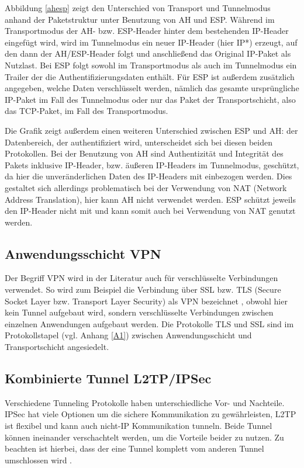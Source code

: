 Abbildung \ref{ahesp} zeigt den Unterschied von Transport und Tunnelmodus anhand der Paketstruktur unter Benutzung von AH und ESP. Während im Transportmodus der AH- bzw. ESP-Header  hinter dem bestehenden IP-Header eingefügt wird, wird im Tunnel\-modus ein neuer IP-Header (hier IP*) erzeugt, auf den dann der AH/ESP-Header folgt und anschließend das Original IP-Paket als Nutzlast. Bei ESP folgt sowohl im Transportmodus als auch im Tunnelmodus ein Trailer der die Authentifizierungsdaten enthält. Für ESP ist außerdem zusätzlich angegeben, welche Daten verschlüsselt werden, nämlich das gesamte ursprüngliche  IP-Paket im Fall des Tunnelmodus oder nur das Paket der Transportschicht, also  das TCP-Paket, im Fall des Transportmodus. 

Die Grafik zeigt außerdem einen weiteren Unterschied zwischen ESP und AH: der Datenbereich, der authentifiziert wird, unterscheidet sich bei diesen beiden Protokollen. Bei der Benutzung von AH sind Authentizität und Integrität des Pakets inklusive IP-Header, bzw. äußeren IP-Headers im Tunnelmodus,  geschützt, da hier die unveränderlichen Daten des IP-Headers mit einbezogen werden. Dies gestaltet sich allerdings problematisch bei der Verwendung von NAT (Network Address Translation), hier kann AH nicht verwendet werden. 
ESP schützt jeweils den IP-Header nicht mit und kann somit auch bei Verwendung von NAT genutzt werden. 

 
\subsection{Anwendungsschicht VPN}

Der Begriff VPN wird in der Literatur auch für verschlüsselte Verbindungen verwendet. So wird zum Beispiel die Verbindung über SSL bzw. TLS (Secure Socket Layer bzw. Transport Layer Security) als VPN bezeichnet \cite{isi-vpn} \cite{singh2012enhancing}, obwohl hier kein Tunnel aufgebaut wird, sondern verschlüsselte Verbindungen zwischen einzelnen Anwendungen aufgebaut werden. Die Protokolle TLS und SSL sind im Protokollstapel (vgl. Anhang \ref{A1}) zwischen Anwendungsschicht und Transportschicht angesiedelt. 

\subsection{Kombinierte Tunnel L2TP/IPSec}

Verschiedene Tunneling Protokolle haben unterschiedliche Vor- und Nachteile.  IPSec hat viele Optionen um die sichere Kommunikation zu gewährleisten, L2TP ist flexibel und kann auch nicht-IP Kommunikation tunneln. Beide Tunnel können ineinander verschachtelt werden, um die Vorteile beider zu nutzen. Zu beachten ist hierbei, dass der eine Tunnel komplett vom anderen Tunnel umschlossen wird \cite{lipp2007vpn}.


